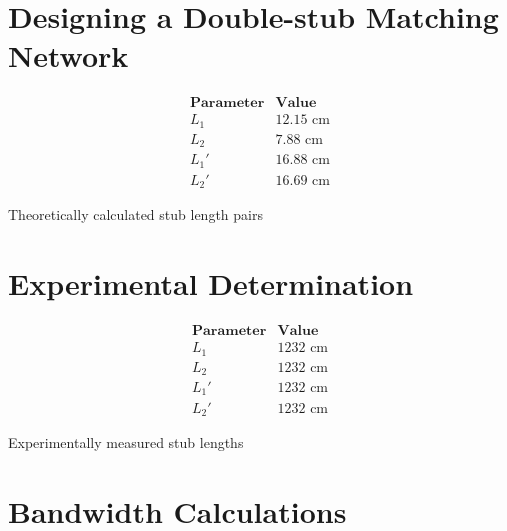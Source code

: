 \documentclass[10pt]{article}
\begin{document}
\section{Designing a Double-stub Matching Network}
\begin{table}
  \[
      \begin{array}{c|c}
          \textbf{Parameter} & \textbf{Value} \\ \hline
          L_1 & 12.15 \text{ cm}\\
          L_2 & 7.88 \text{ cm}\\
          L_1' & 16.88 \text{ cm}\\
          L_2' & 16.69 \text{ cm}
      \end{array}
  \]
  \caption{Theoretically calculated stub length pairs}
\end{table}

\section{Experimental Determination }
\begin{table}
  \[
      \begin{array}{c|c}
          \textbf{Parameter} & \textbf{Value} \\ \hline
          L_1 & 1232 \text{ cm}\\
          L_2 & 1232 \text{ cm}\\
          L_1' & 1232 \text{ cm}\\
          L_2' & 1232 \text{ cm}
      \end{array}
  \]
  \caption{Experimentally measured stub lengths}
\end{table}
\section{Bandwidth Calculations}
\end{document}
